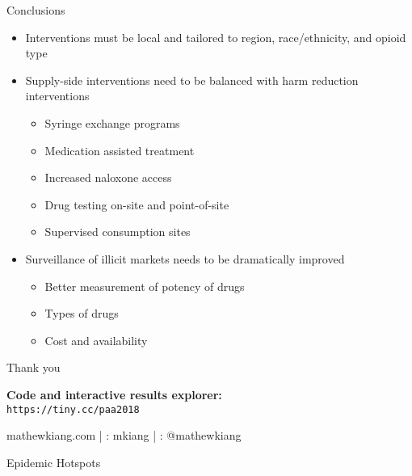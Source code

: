 \documentclass[ignorenonframetext,compress]{beamer}
\providecommand{\tightlist}{%
  \setlength{\itemsep}{0pt}\setlength{\parskip}{0pt}}
\begin{document}
\begin{frame}{Conclusions}

\begin{itemize}[<+->]
\tightlist
\item
  Interventions must be local and tailored to region, race/ethnicity,
  and opioid type
\item
  Supply-side interventions need to be balanced with harm reduction
  interventions

  \begin{itemize}[<+->]
  \tightlist
  \item
    Syringe exchange programs
  \item
    Medication assisted treatment
  \item
    Increased naloxone access
  \item
    Drug testing on-site and point-of-site
  \item
    Supervised consumption sites
  \end{itemize}
\item
  Surveillance of illicit markets needs to be dramatically improved

  \begin{itemize}[<+->]
  \tightlist
  \item
    Better measurement of potency of drugs
  \item
    Types of drugs
  \item
    Cost and availability
  \end{itemize}
\end{itemize}

\end{frame}

\begin{frame}{Thank you}

\Large

\begin{center}
\textbf{Code and interactive results explorer:} \\ \texttt{https://tiny.cc/paa2018} \newline \newline

 mathewkiang.com | \faGithub: mkiang | \faTwitter: @mathewkiang 

\end{center}

\end{frame}

\begin{frame}{Epidemic Hotspots}

\end{frame}
\end{document}
